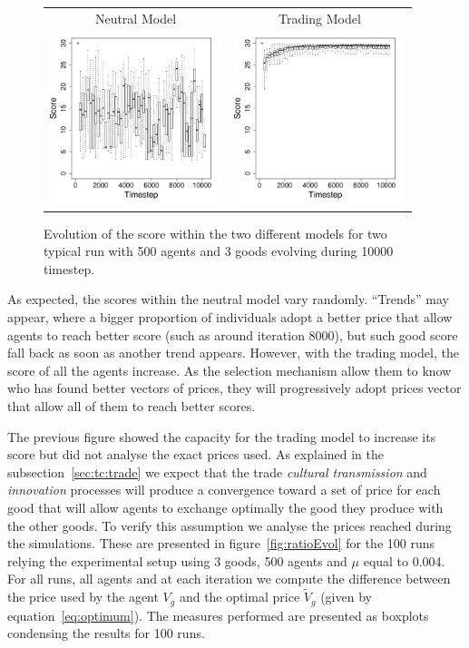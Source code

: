 \documentclass[a4paper]{article}
\begin{document}
\begin{figure}[!h]
	\centering
	\begin{tabular}{ c c}
		 Neutral Model & Trading Model \\
		 \includegraphics[width=5cm]{img/ScoreEvolutionForRandom-G3N500.pdf}
		 & \includegraphics[width=5cm]{img/ScoreEvolutionForTrade-G3N500.pdf}

	\end{tabular}
	\caption{Evolution of the score within the two different models for two typical run with 500 agents and 3 goods evolving during 10000 timestep.}%
	\label{fig:scoreEvol}
\end{figure}

As expected, the scores within the neutral model vary randomly. ``Trends'' may appear, where a bigger proportion of individuals adopt a better price that allow agents to reach better score (such as around iteration 8000), but such good score fall back as soon as another trend appears. However, with the trading model, the score of all the agents increase. As the selection mechanism allow them to know who has found better vectors of prices, they will progressively adopt prices vector that allow all of them to reach better scores. 

The previous figure showed the capacity for the trading model to increase its score but did not analyse the exact prices used. As explained in the subsection~\ref{sec:tc:trade} we expect that the trade \emph{cultural transmission} and \emph{innovation} processes will produce a convergence toward a set of price for each good that will allow agents to exchange optimally the good they produce with the other goods. To verify this assumption we analyse the prices reached during the simulations. These are presented in figure~\ref{fig:ratioEvol} for the 100 runs relying the experimental setup using 3 goods, 500 agents and $\mu$ equal to 0.004. For all runs, all agents and at each iteration we compute the difference between the price used by the agent $V_g$ and the optimal price $\tilde{V}_g$ (given by equation~\ref{eq:optimum}). The measures performed are presented as boxplots condensing the results for 100 runs.
\end{document}
